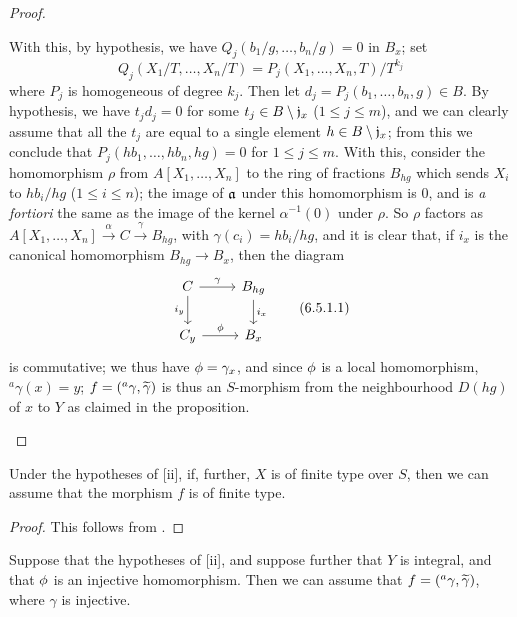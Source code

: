 \begin{proof}
\begin{enumerate}[label=(\roman*)]
        With this, by hypothesis, we have $Q_j(b_1/g,\ldots,b_n/g)=0$ in $B_x$;
        set
        \[
            Q_j(X_1/T,\ldots,X_n/T)=P_j(X_1,\ldots,X_n,T)/T^{k_j}
        \]
        where $P_j$ is homogeneous of degree $k_j$.
        Then let $d_j=P_j(b_1,\ldots,b_n,g)\in B$.
        By hypothesis, we have $t_jd_j=0$ for some $t_j\in B\setminus\mathfrak{j}_x$ ($1\leqslant j\leqslant m$), and we can clearly assume that all the $t_j$ are equal to a single element $h\in B\setminus\mathfrak{j}_x$;
        from this we conclude that $P_j(hb_1,\ldots,hb_n,hg)=0$ for $1\leqslant j\leqslant m$.
        With this, consider the homomorphism $\rho$ from $A[X_1,\ldots,X_n]$ to the ring of fractions $B_{hg}$ which sends $X_i$ to $hb_i/hg$ ($1\leqslant i\leqslant n$);
        the image of $\mathfrak{a}$ under this homomorphism is $0$, and is \emph{a fortiori} the same as the image of the kernel $\alpha^{-1}(0)$ under $\rho$.
        So $\rho$ factors as $A[X_1,\ldots,X_n]\xrightarrow{\alpha}C\xrightarrow{\gamma}B_{hg}$, with $\gamma(c_i)=hb_i/hg$, and it is clear that, if $i_x$ is the canonical homomorphism $B_{hg}\to B_x$, then the diagram
        \[
          \begin{tikzcd}
            C\ar[r,"\gamma"]\ar[d,swap,"i_y"] &
            B_{hg}\ar[d,"i_x"]\\
            C_y\ar[r,"\vphi"] &
            B_x
          \end{tikzcd}
          \tag{6.5.1.1}
        \]
        is commutative; we thus have $\phi=\gamma_x$, and since $\phi$ is a local homomorphism, $^a\gamma(x)=y$;
        $f=({}^a\gamma,\widetilde{\gamma})$ is thus an $S$-morphism from the neighbourhood $D(hg)$ of $x$ to $Y$ as claimed in the proposition.
\end{enumerate}
\end{proof}

\begin{cor}[6.5.2]
\label{1.6.5.2}
Under the hypotheses of [ii], if, further, $X$ is of finite type over $S$, then we can assume that the morphism $f$ is of finite type.
\end{cor}

\begin{proof}
\label{proof-1.6.5.2}
This follows from .
\end{proof}

\begin{cor}[6.5.3]
\label{1.6.5.3}
Suppose that the hypotheses of [ii], and suppose further that $Y$ is integral, and that $\phi$ is an injective homomorphism.
Then we can assume that $f=({}^a\gamma,\widetilde{\gamma})$, where $\gamma$ is injective.
\end{cor}

